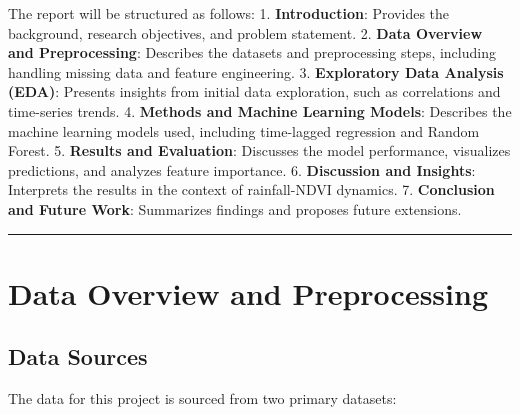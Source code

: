 \documentclass[
]{article}
\begin{document}
The report will be structured as follows: 1. \textbf{Introduction}:
Provides the background, research objectives, and problem statement. 2.
\textbf{Data Overview and Preprocessing}: Describes the datasets and
preprocessing steps, including handling missing data and feature
engineering. 3. \textbf{Exploratory Data Analysis (EDA)}: Presents
insights from initial data exploration, such as correlations and
time-series trends. 4. \textbf{Methods and Machine Learning Models}:
Describes the machine learning models used, including time-lagged
regression and Random Forest. 5. \textbf{Results and Evaluation}:
Discusses the model performance, visualizes predictions, and analyzes
feature importance. 6. \textbf{Discussion and Insights}: Interprets the
results in the context of rainfall-NDVI dynamics. 7. \textbf{Conclusion
and Future Work}: Summarizes findings and proposes future extensions.

\begin{center}\rule{0.5\linewidth}{0.5pt}\end{center}

\section{Data Overview and
Preprocessing}\label{data-overview-and-preprocessing}

\subsection{Data Sources}\label{data-sources}

The data for this project is sourced from two primary datasets:
\end{document}
